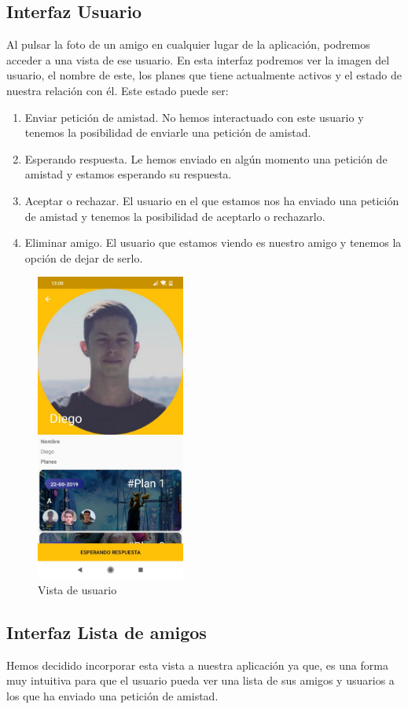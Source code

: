 \subsection{Interfaz Usuario}
Al pulsar la foto de un amigo en cualquier lugar de la aplicación, podremos acceder a una vista de ese usuario.
En esta interfaz podremos ver la imagen del usuario, el nombre de este, los planes que tiene actualmente activos 
y el estado de nuestra relación con él. Este estado puede ser:
\begin{enumerate}
    \item Enviar petición de amistad. No hemos interactuado con este usuario y tenemos la posibilidad de enviarle 
    una petición de amistad.
    \item Esperando respuesta. Le hemos enviado en algún momento una petición de amistad y estamos esperando su respuesta.
    \item Aceptar o rechazar. El usuario en el que estamos nos ha enviado una petición de amistad y tenemos la posibilidad de 
    aceptarlo o rechazarlo.
    \item Eliminar amigo. El usuario que estamos viendo es nuestro amigo y tenemos la opción de dejar de serlo.
\end{enumerate}
\begin{figure}[H]
    \centering
    \includegraphics[height=4in]{figures/chapter-3/info-user.jpg}
    \caption{Vista de usuario}
    \label{fig:usuario}
\end{figure}
\subsection{Interfaz Lista de amigos}
Hemos decidido incorporar esta vista a nuestra aplicación ya que, es una forma muy intuitiva para que el usuario pueda ver una lista de sus amigos y usuarios a los que
ha enviado una petición de amistad.

